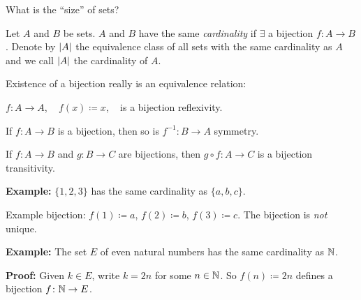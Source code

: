 \documentclass[10pt,aspectratio=169]{beamer}
\begin{document}
\begin{frame}
What is the ``size'' of sets?

\pause

\begin{definition}
Let $A$ and $B$ be sets.  $A$ and $B$ have the same
\emph{cardinality}
if $\exists$ a bijection $f \colon A \to B$.
\pause
Denote by $\left\lvert {A} \right\rvert$ the equivalence class of all sets with the same cardinality as
$A$ and we call $\left\lvert {A} \right\rvert$ the cardinality of $A$.
\end{definition}

\pause
Existence of a bijection really is an equivalence relation:

\pause
$f \colon A \to A$, ~ $f(x) \coloneqq x$, ~ is a bijection \wthus reflexivity.

\pause
If $f \colon A \to B$ is a bijection, then so is $f^{-1} \colon B \to A$ \wthus symmetry.

\pause
If $f \colon A \to B$ and $g \colon B \to C$ are bijections, then
$g \circ f \colon A \to C$ is a bijection
\wthus transitivity.

\medskip
\pause

\textbf{Example:}
$\{ 1,2,3 \}$ has the same cardinality as $\{ a,b,c \}$.

\pause
Example bijection: $f(1) \coloneqq a$, $f(2) \coloneqq b$, $f(3) \coloneqq c$.
\pause  The bijection is \emph{not} unique.

\medskip
\pause

\textbf{Example:}
The set $E$ of even natural numbers has the same cardinality as ${\mathbb{N}}$.

\pause
\textbf{Proof:}
Given $k \in E$, write $k=2n$ for some $n \in {\mathbb{N}}$.
\pause
So
$f(n) \coloneqq 2n$ defines a bijection $f \colon {\mathbb{N}} \to E$.

\end{frame}
\end{document}
